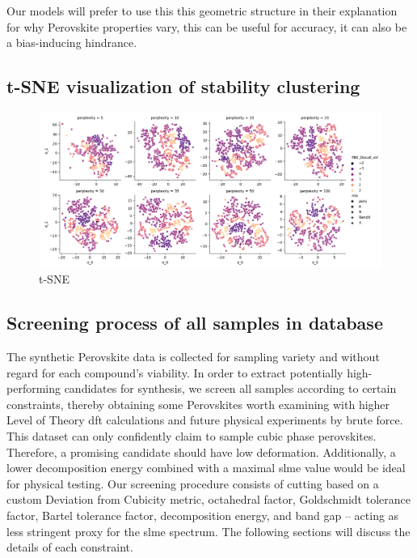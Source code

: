 \documentclass[twoside, twocolumn, 9pt, draft]{article}
\begin{document}
Our models will prefer to use this this geometric structure in their
explanation for why Perovskite properties vary, this can be useful for
accuracy, it can also be a bias-inducing hindrance.

\subsection*{t-SNE visualization of stability clustering}
\label{sec:org4e275ec}
\begin{figure}
\centering
\includegraphics[width=.9\linewidth]{./multivar/tsne_comp_DecoE_clusters.png}
\caption{\label{fig:tsne} t-SNE}
\end{figure}

\subsection*{Screening process of all samples in database}
\label{sec:org267a164}
The synthetic Perovskite data is collected for sampling variety and
without regard for each compound's viability. In order to extract
potentially high-performing candidates for synthesis, we screen all
samples according to certain constraints, thereby obtaining some
Perovskites worth examining with higher Level of Theory
\acrshort{dft} calculations and future physical experiments by
brute force. This dataset can only confidently claim to sample cubic
phase perovskites. Therefore, a promising candidate should have low
deformation. Additionally, a lower decomposition energy combined with
a maximal \gls{slme} value would be ideal for physical
testing. Our screening procedure consists of cutting based on a custom
Deviation from Cubicity metric, octahedral factor, Goldschmidt
tolerance factor, Bartel tolerance factor, decomposition energy, and
band gap -- acting as less stringent proxy for the \gls{slme}
spectrum. The following sections will discuss the details of each
constraint.
\end{document}
